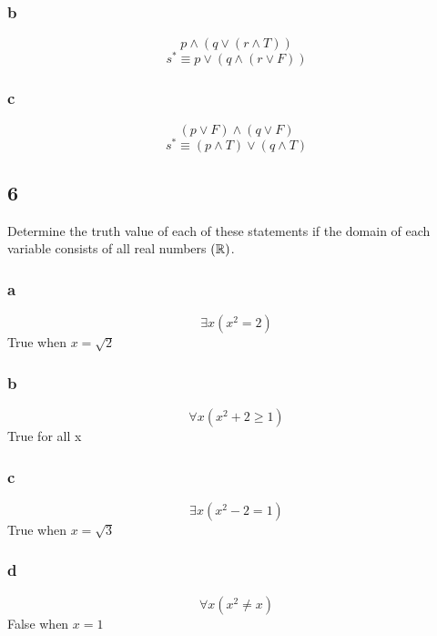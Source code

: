 \documentclass[letterpaper, 12pt]{math}
\begin{document}
\subsubsection*{b}
\[ p \wedge (q \vee (r \wedge T)) \]
\[ s^{*} \equiv p \vee (q \wedge (r \vee F)) \]

\subsubsection*{c}
\[ (p \vee F) \wedge (q \vee F) \]
\[ s^{*} \equiv (p \wedge T) \vee (q \wedge T) \]

\subsection*{6}
Determine the truth value of each of these statements if the domain of each
variable consists of all real numbers \( (\mathbb{R}) \).

\subsubsection*{a}
\[ \exists{x}(x^{2} = 2) \]
True when \( x = \sqrt{2} \)

\subsubsection*{b}
\[ \forall{x}(x^{2}+2 \geq 1) \]
True for all x

\subsubsection*{c}
\[ \exists{x}(x^{2}-2 = 1) \]
True when \( x = \sqrt{3} \)

\subsubsection*{d}
\[ \forall{x}(x^{2} \neq x) \]
False when \( x = 1 \)
\end{document}
